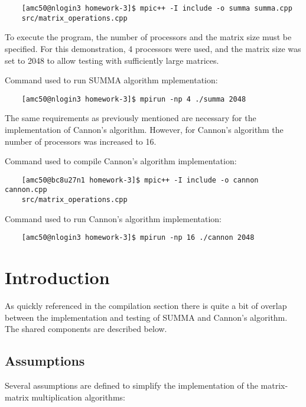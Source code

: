 \documentclass{article}
\begin{document}
\begin{verbatim}
    [amc50@nlogin3 homework-3]$ mpic++ -I include -o summa summa.cpp
    src/matrix_operations.cpp
\end{verbatim}

\bigskip
\noindent
To execute the program, the number of processors and the matrix size must be specified. For this demonstration, 4 processors were used, and the matrix size was set to 2048 to allow testing with sufficiently large matrices.

\bigskip
\noindent
Command used to run SUMMA algorithm mplementation:

\begin{verbatim}
    [amc50@nlogin3 homework-3]$ mpirun -np 4 ./summa 2048
\end{verbatim}

\bigskip
\noindent
The same requirements as previously mentioned are necessary for the implementation of Cannon's algorithm. However, for Cannon's algorithm the number of processors was increased to 16.

\bigskip
\noindent
Command used to compile Cannon's algorithm implementation:
\begin{verbatim}
    [amc50@bc8u27n1 homework-3]$ mpic++ -I include -o cannon cannon.cpp 
    src/matrix_operations.cpp 
\end{verbatim}

\bigskip
\noindent
Command used to run Cannon's algorithm implementation:
\begin{verbatim}
    [amc50@nlogin3 homework-3]$ mpirun -np 16 ./cannon 2048
\end{verbatim}

\section{Introduction}
As quickly referenced in the compilation section there is quite a bit of overlap between the implementation and testing of SUMMA and Cannon's algorithm. The shared components are described below.

\subsection{Assumptions}
Several assumptions are defined to simplify the implementation of the matrix-matrix multiplication algorithms:
\end{document}
